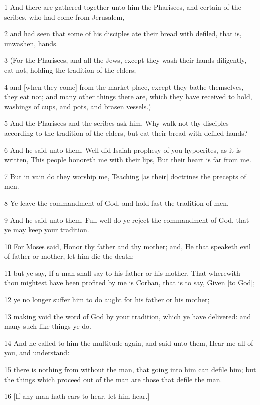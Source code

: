 \par 1 And there are gathered together unto him the Pharisees, and certain of the scribes, who had come from Jerusalem,
\par 2 and had seen that some of his disciples ate their bread with defiled, that is, unwashen, hands.
\par 3 (For the Pharisees, and all the Jews, except they wash their hands diligently, eat not, holding the tradition of the elders;
\par 4 and [when they come] from the market-place, except they bathe themselves, they eat not; and many other things there are, which they have received to hold, washings of cups, and pots, and brasen vessels.)
\par 5 And the Pharisees and the scribes ask him, Why walk not thy disciples according to the tradition of the elders, but eat their bread with defiled hands?
\par 6 And he said unto them, Well did Isaiah prophesy of you hypocrites, as it is written, This people honoreth me with their lips, But their heart is far from me.
\par 7 But in vain do they worship me, Teaching [as their] doctrines the precepts of men.
\par 8 Ye leave the commandment of God, and hold fast the tradition of men.
\par 9 And he said unto them, Full well do ye reject the commandment of God, that ye may keep your tradition.
\par 10 For Moses said, Honor thy father and thy mother; and, He that speaketh evil of father or mother, let him die the death:
\par 11 but ye say, If a man shall say to his father or his mother, That wherewith thou mightest have been profited by me is Corban, that is to say, Given [to God];
\par 12 ye no longer suffer him to do aught for his father or his mother;
\par 13 making void the word of God by your tradition, which ye have delivered: and many such like things ye do.
\par 14 And he called to him the multitude again, and said unto them, Hear me all of you, and understand:
\par 15 there is nothing from without the man, that going into him can defile him; but the things which proceed out of the man are those that defile the man.
\par 16 [If any man hath ears to hear, let him hear.]
